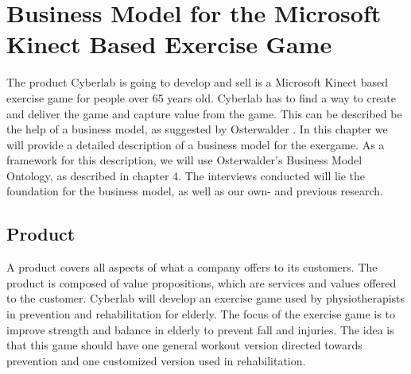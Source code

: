 \chapter{Business Model for the Microsoft Kinect Based Exercise Game}
The product Cyberlab is going to develop and sell is a Microsoft Kinect based exercise game for people over 65 years old. Cyberlab has to find a way to create and deliver the game and capture value from the game. This can be described be the help of a business model, as suggested by Osterwalder \cite{osterwalder}. In this chapter we will provide a detailed description of a business model for the exergame. As a framework for this description, we will use Osterwalder's Business Model Ontology, as described in chapter 4. The interviews conducted will lie the foundation for the business model, as well as our own- and previous research. 

\section{Product}
A product covers all aspects of what a company offers to its customers. The product is composed of value propositions, which are services and values offered to the customer. Cyberlab will develop an exercise game used by physiotherapists in prevention and rehabilitation for elderly. The focus of the exercise game is to improve strength and balance in elderly to prevent fall and injuries. The idea is that this game should have one general workout version directed towards prevention and one customized version used in rehabilitation.
